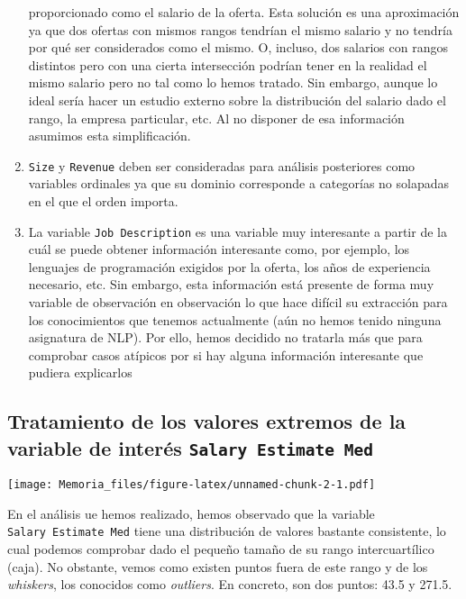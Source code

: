 \documentclass[
]{article}
\begin{document}
\begin{enumerate}
  proporcionado como el salario de la oferta. Esta solución es una
  aproximación ya que dos ofertas con mismos rangos tendrían el mismo
  salario y no tendría por qué ser considerados como el mismo. O,
  incluso, dos salarios con rangos distintos pero con una cierta
  intersección podrían tener en la realidad el mismo salario pero no tal
  como lo hemos tratado. Sin embargo, aunque lo ideal sería hacer un
  estudio externo sobre la distribución del salario dado el rango, la
  empresa particular, etc. Al no disponer de esa información asumimos
  esta simplificación.
\item
  \texttt{Size} y \texttt{Revenue} deben ser consideradas para análisis
  posteriores como variables ordinales ya que su dominio corresponde a
  categorías no solapadas en el que el orden importa.
\item
  La variable \texttt{Job\ Description} es una variable muy interesante
  a partir de la cuál se puede obtener información interesante como, por
  ejemplo, los lenguajes de programación exigidos por la oferta, los
  años de experiencia necesario, etc. Sin embargo, esta información está
  presente de forma muy variable de observación en observación lo que
  hace difícil su extracción para los conocimientos que tenemos
  actualmente (aún no hemos tenido ninguna asignatura de NLP). Por ello,
  hemos decidido no tratarla más que para comprobar casos atípicos por
  si hay alguna información interesante que pudiera explicarlos
\end{enumerate}

\hypertarget{tratamiento-de-los-valores-extremos-de-la-variable-de-interuxe9s-salary-estimate-med}{%
\subsection{\texorpdfstring{Tratamiento de los valores extremos de la
variable de interés
\texttt{Salary\ Estimate\ Med}}{Tratamiento de los valores extremos de la variable de interés Salary Estimate Med}}\label{tratamiento-de-los-valores-extremos-de-la-variable-de-interuxe9s-salary-estimate-med}}

\texttt{[image: Memoria\_files/figure-latex/unnamed-chunk-2-1.pdf]}

En el análisis ue hemos realizado, hemos observado que la variable
\texttt{Salary\ Estimate\ Med} tiene una distribución de valores
bastante consistente, lo cual podemos comprobar dado el pequeño tamaño
de su rango intercuartílico (caja). No obstante, vemos como existen
puntos fuera de este rango y de los \emph{whiskers}, los conocidos como
\emph{outliers}. En concreto, son dos puntos: 43.5 y 271.5.
\end{document}
